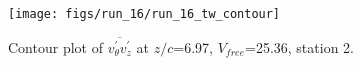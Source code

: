 \begin{figure}[H]
\centering
\texttt{[image: figs/run\_16/run\_16\_tw\_contour]}
\caption{Contour plot of $\overline{v_{\theta}^{\prime} v_{z}^{\prime}}$ at $z/c$=6.97, $V_{free}$=25.36, station 2.}
\label{fig:run_16_tw_contour}
\end{figure}


